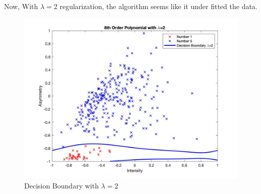 \documentclass[12pt]{article}
\begin{document}
\newpage
{} \\\\
\indent Now, With $\lambda = 2$ regularization, the algorithm seems like it under fitted the data.
\begin{figure}[H]
  \centering
  \includegraphics[scale = 0.3]{2.jpg}
  \caption{Decision Boundary with $\lambda = 2$}
  \label{fig:2}
\end{figure}
\end{document}
